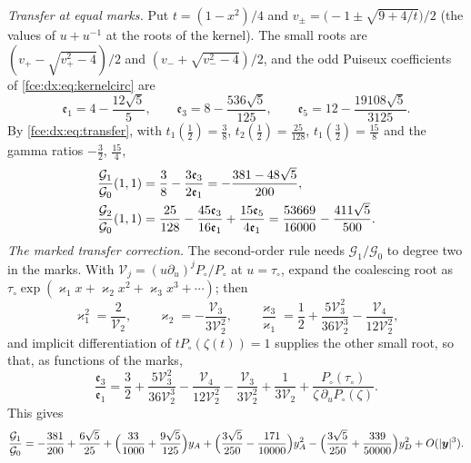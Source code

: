 \documentclass[11pt,a4paper]{article}
\numberwithin{equation}{section}
\theoremstyle{definition}\newtheorem{definition}[theorem]{Definition}
\theoremstyle{remark}\newtheorem{remark}[theorem]{Remark}
\begin{document}
\emph{Transfer at equal marks.} Put $t=(1-x^2)/4$ and
$v_\pm=\bigl(-1\pm\sqrt{9+4/t}\bigr)/2$ (the values of $u+u^{-1}$ at the roots
of the kernel). The small roots are $(v_+-\sqrt{v_+^2-4})/2$ and
$(v_-+\sqrt{v_-^2-4})/2$, and the odd Puiseux coefficients of
\eqref{fce:dx:eq:kernelcirc} are
\begin{equation}\label{fce:dx:eq:puiseux5}
 \mathfrak e_1=4-\frac{12\sqrt5}5,\qquad
 \mathfrak e_3=8-\frac{536\sqrt5}{125},\qquad
 \mathfrak e_5=12-\frac{19108\sqrt5}{3125}.
\end{equation}
By \eqref{fce:dx:eq:transfer}, with $t_1(\frac12)=\frac38$,
$t_2(\frac12)=\frac{25}{128}$, $t_1(\frac32)=\frac{15}8$ and the gamma ratios
$-\frac32$, $\frac{15}4$,
\begin{align}\label{fce:dx:eq:G1G2}
 \frac{\mathcal G_1}{\mathcal G_0}(1,1)&=\frac38-\frac{3\mathfrak e_3}{2\mathfrak e_1}=-\frac{381-48\sqrt5}{200},\\
 \frac{\mathcal G_2}{\mathcal G_0}(1,1)&=\frac{25}{128}-\frac{45\mathfrak e_3}{16\mathfrak e_1}
 +\frac{15\mathfrak e_5}{4\mathfrak e_1}=\frac{53669}{16000}-\frac{411\sqrt5}{500}.\notag
\end{align}
\emph{The marked transfer correction.} The second-order rule needs
$\mathcal G_1/\mathcal G_0$ to degree two in the marks. With
$\mathcal V_j=(u\partial_u)^jP_\circ/P_\circ$ at $u=\tau_\circ$, expand the
coalescing root as $\tau_\circ\exp(\varkappa_1x+\varkappa_2x^2+\varkappa_3x^3+\cdots)$;
then
\[
 \varkappa_1^2=\frac2{\mathcal V_2},\qquad
 \varkappa_2=-\frac{\mathcal V_3}{3\mathcal V_2^2},\qquad
 \frac{\varkappa_3}{\varkappa_1}=\frac12+\frac{5\mathcal V_3^2}{36\mathcal V_2^3}-\frac{\mathcal V_4}{12\mathcal V_2^2},
\]
and implicit differentiation of $tP_\circ(\zeta(t))=1$ supplies the other small
root, so that, as functions of the marks,
\begin{equation}\label{fce:dx:eq:R3}
 \frac{\mathfrak e_3}{\mathfrak e_1}=\frac32+\frac{5\mathcal V_3^2}{36\mathcal V_2^3}
 -\frac{\mathcal V_4}{12\mathcal V_2^2}-\frac{\mathcal V_3}{3\mathcal V_2^2}
 +\frac1{3\mathcal V_2}+\frac{P_\circ(\tau_\circ)}{\zeta\,\partial_uP_\circ(\zeta)} .
\end{equation}
This gives
\begin{equation}\label{fce:dx:eq:G1jet}
 \frac{\mathcal G_1}{\mathcal G_0}=-\frac{381}{200}+\frac{6\sqrt5}{25}
 +\Bigl(\frac{33}{1000}+\frac{9\sqrt5}{125}\Bigr)y_A
 +\Bigl(\frac{3\sqrt5}{250}-\frac{171}{10000}\Bigr)y_A^2
 -\Bigl(\frac{3\sqrt5}{250}+\frac{339}{50000}\Bigr)y_D^2+O(|\boldsymbol y|^3).
\end{equation}
\end{document}

